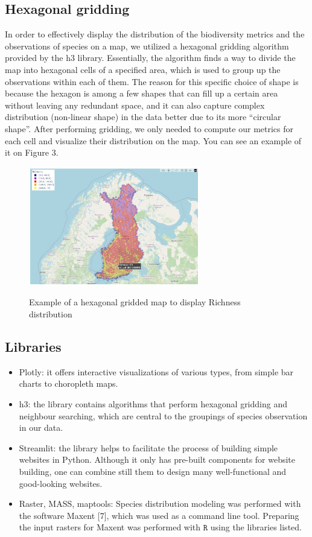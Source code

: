 \documentclass{article}
\begin{document}
\subsection{Hexagonal gridding}
In order to effectively display the distribution of the biodiversity metrics and the observations of species on a map, we utilized a hexagonal gridding algorithm provided by the h3 library. Essentially, the algorithm finds a way to divide the map into hexagonal cells of a specified area, which is used to group up the observations within each of them. The reason for this specific choice of shape is because the hexagon is among a few shapes that can fill up a certain area without leaving any redundant space, and it can also capture complex distribution (non-linear shape) in the data better due to its more “circular shape”. After performing gridding, we only needed to compute our metrics for each cell and visualize their distribution on the map. You can see an example of it on Figure 3.
\begin{figure}[h]
	\vspace*{-3mm}
	\centering
	\includegraphics[width=7.46cm]{hexagonal_gridding}\label{hexagonal_gridding}
	\vspace*{-2mm}
	\caption{Example of a hexagonal gridded map to display Richness distribution}
\end{figure}
\vspace*{-5mm}
\subsection{Libraries}
\begin{itemize}
	\setlength\itemsep{1mm}
	\item Plotly: it offers interactive visualizations of various types, from simple bar charts to choropleth maps.
	\item h3: the library contains algorithms that perform hexagonal gridding and neighbour searching, which are central to the groupings of species observation in our data.
	\item Streamlit: the library helps to facilitate the process of building simple websites in Python. Although it only has pre-built components for website building, one can combine still them to design many well-functional and good-looking websites.
	\item Raster, MASS, maptools: Species distribution modeling was performed with the software Maxent [7], which was used as a command line tool. Preparing the input rasters for Maxent was performed with $\texttt{R}$ using the  libraries listed.
\end{itemize}
\end{document}
